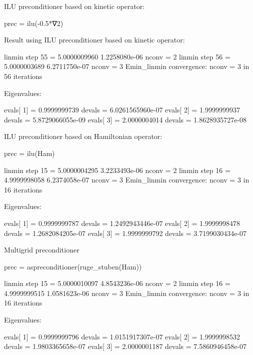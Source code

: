 ILU preconditioner based on kinetic operator:
\begin{juliacode}
prec = ilu(-0.5*∇2)
\end{juliacode}

Result using ILU preconditioner based on kinetic operator:
\begin{fullwidth}
\begin{textcode}
linmin step       55 =       5.0000009960   1.2258080e-06  nconv =     2
linmin step       56 =       5.0000003689   6.2711750e-07  nconv =     3
Emin_linmin convergence: nconv =     3 in    56 iterations

Eigenvalues:

evals[  1] =       0.9999999739 devals =   6.0261565960e-07
evals[  2] =       1.9999999937 devals =   5.8729066055e-09
evals[  3] =       2.0000004014 devals =   1.8628935727e-08  
\end{textcode}
\end{fullwidth}

ILU preconditioner based on Hamiltonian operator:
\begin{juliacode}
prec = ilu(Ham)
\end{juliacode}

\begin{fullwidth}
\begin{textcode}
linmin step       15 =       5.0000004295   3.2233493e-06  nconv =     2
linmin step       16 =       4.9999998058   6.2374058e-07  nconv =     3
Emin_linmin convergence: nconv =     3 in    16 iterations
  
Eigenvalues:
  
evals[  1] =       0.9999999787 devals =   1.2492943446e-07
evals[  2] =       1.9999998478 devals =   1.2682084205e-07
evals[  3] =       1.9999999792 devals =   3.7199030434e-07
\end{textcode}
\end{fullwidth}

Multigrid preconditioner
\begin{juliacode}
prec = aspreconditioner(ruge_stuben(Ham))
\end{juliacode}

\begin{fullwidth}
\begin{textcode}
linmin step       15 =       5.0000010097   4.8543236e-06  nconv =     2
linmin step       16 =       4.9999999515   1.0581623e-06  nconv =     3
Emin_linmin convergence: nconv =     3 in    16 iterations

Eigenvalues:

evals[  1] =       0.9999999796 devals =   1.0151917307e-07
evals[  2] =       1.9999998532 devals =   1.9803365658e-07
evals[  3] =       2.0000001187 devals =   7.5860946458e-07
\end{textcode}
\end{fullwidth}


